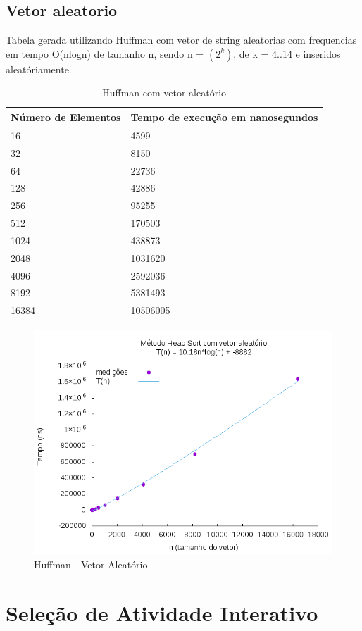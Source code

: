 \documentclass[12pt,a4paper,twoside]{report}
\begin{document}
\subsection{Vetor aleatorio}
Tabela gerada utilizando Huffman com vetor de string aleatorias com frequencias em tempo O(nlogn) de tamanho n, sendo n = $(2^k)$, de k = 4..14 e inseridos aleatóriamente.
\begin{table}[H]
\centering
\caption{Huffman com vetor aleatório}
\label{my-label}
\begin{tabular}{|l|l|}
\hline
\multicolumn{1}{|c|}{\textbf{Número de Elementos}} & \multicolumn{1}{c|}{\textbf{Tempo de execução em nanosegundos}} \\ \hline
16 & 4599 \\ \hline
32 & 8150 \\ \hline
64 & 22736 \\ \hline
128 & 42886 \\ \hline
256 & 95255 \\ \hline
512 & 170503 \\ \hline
1024 & 438873 \\ \hline
2048 & 1031620 \\ \hline
4096 & 2592036 \\ \hline
8192 & 5381493 \\ \hline
16384 & 10506005 \\ \hline

\end{tabular}
\end{table}

\begin{figure}[H]
    \centering
    \includegraphics[width=0.7\linewidth]{graficos/HeapSort/vIntAleatorio/vIntAleatorio.png}
  \caption{Huffman - Vetor Aleatório}
\end{figure}

\section{Seleção de Atividade Interativo}
\end{document}
